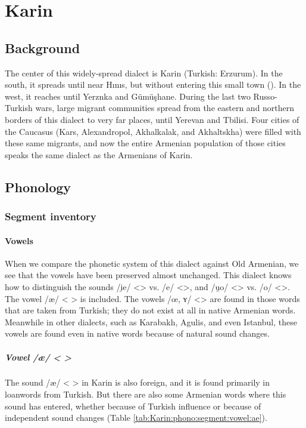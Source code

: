 \chapter{Karin}\label{chapter:Karin}
\section{Background}
\begin{adjarianpage}\label{page:104}\end{adjarianpage}%


The center of this widely-spread dialect is Karin (Turkish: Erzurum). In the south, it spreads until near Hınıs, but without entering this small town (). In the west, it reaches until Yerznka and Gümüşhane. During the last two Russo-Turkish wars, large migrant communities spread from the eastern and northern borders of this dialect to very far places, until Yerevan and Tbilisi. Four cities of the Caucasus (Kars, Alexandropol, Akhalkalak, and Akhaltskha) were filled with these same migrants, and now the entire Armenian population of those cities speaks the same dialect as the Armenians of Karin. 

\section{Phonology}

\subsection{Segment inventory}

\subsubsection{Vowels}
When we compare the phonetic system of this dialect against Old Armenian, we see that the vowels have been preserved almost unchanged. This dialect knows how to distinguish the sounds /i̯e/ <> vs. /e/ <>, and /u̯o/ <> vs. /o/ <>. The vowel /æ/ < > is included. The vowels /œ, ʏ/ <> are found in those words that are taken from Turkish; they do not exist at all in native Armenian words. Meanwhile in other dialects, such as Karabakh, Agulis, and even Istanbul, these vowels are found even in native words because of natural sound changes.

\paragraph{Vowel /æ/ < >}
The sound /æ/ < > in Karin is also foreign, and it is found primarily in loanwords from Turkish. But there are also some Armenian words where this sound has entered, whether because of Turkish influence or because of independent sound changes (Table \ref{tab:Karin:phono:segment:vowel:ae}).

